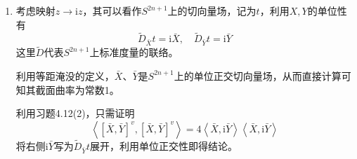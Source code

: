 \documentclass[a4paper,UTF8,fontset=windows,10pt]{ctexart}
\begin{document}
\begin{enumerate}
\begin{enumerate}[(1)]
        \item 考虑映射$z\to\mathrm{i}z$，其可以看作$S^{2n+1}$上的切向量场，记为$t$，利用$X,Y$的单位性有
        $$\tilde{D}_{\bar X}t=\mathrm{i}\bar X,\quad\tilde{D}_{\bar Y}t=\mathrm{i}\bar Y$$
        这里$\tilde{D}$代表$S^{2n+1}$上标准度量的联络。
    
        利用等距淹没的定义，$\bar{X}$、$\bar{Y}$是$S^{2n+1}$上的单位正交切向量场，从而直接计算可知其截面曲率为常数1。
    
        利用习题4.12(2)，只需证明
        $$\left<[\bar X,\bar Y]^v,[\bar X,\bar Y]^v\right>=4\left<\bar X,\mathrm{i}\bar Y\right>\left<\bar X,\mathrm{i}\bar Y\right>$$
        将右侧$\mathrm{i}\bar Y$写为$\tilde{D}_{\bar Y}t$展开，利用单位正交性即得结论。
    \end{enumerate}
\end{enumerate}
\end{document}
